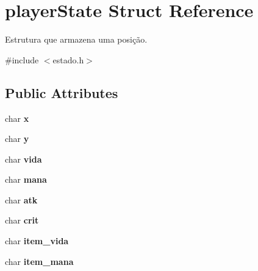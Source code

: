 \hypertarget{structplayerState}{}\section{player\+State Struct Reference}
\label{structplayerState}


Estrutura que armazena uma posição.  




{\ttfamily \#include $<$estado.\+h$>$}

\subsection*{Public Attributes}
\begin{DoxyCompactItemize}
\item 
char {\bfseries x}\hypertarget{structplayerState_adbe3cd61987e42a7b41cdc05895e65ae}{}\label{structplayerState_adbe3cd61987e42a7b41cdc05895e65ae}

\item 
char {\bfseries y}\hypertarget{structplayerState_ae3a4725d8ab0aba7c4f0d46a14a9a135}{}\label{structplayerState_ae3a4725d8ab0aba7c4f0d46a14a9a135}

\item 
char {\bfseries vida}\hypertarget{structplayerState_a8f9b3022d528b4063db5c0817be22d94}{}\label{structplayerState_a8f9b3022d528b4063db5c0817be22d94}

\item 
char {\bfseries mana}\hypertarget{structplayerState_ac4c208a26127f91705448b67c237bf55}{}\label{structplayerState_ac4c208a26127f91705448b67c237bf55}

\item 
char {\bfseries atk}\hypertarget{structplayerState_a104ce44392959cf23901ff874d095284}{}\label{structplayerState_a104ce44392959cf23901ff874d095284}

\item 
char {\bfseries crit}\hypertarget{structplayerState_ac43e977722018a5389e619adf5bb4008}{}\label{structplayerState_ac43e977722018a5389e619adf5bb4008}

\item 
char {\bfseries item\+\_\+vida}\hypertarget{structplayerState_a5efbac8c59be36f557970ac71b4d2652}{}\label{structplayerState_a5efbac8c59be36f557970ac71b4d2652}

\item 
char {\bfseries item\+\_\+mana}\hypertarget{structplayerState_aeea84720db87c481a30234f28b53b01a}{}\label{structplayerState_aeea84720db87c481a30234f28b53b01a}


\end{DoxyCompactItemize}

